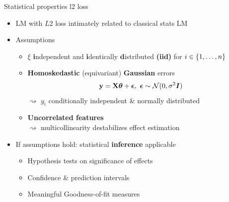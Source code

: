 \documentclass[11pt,compress,t,notes=noshow, xcolor=table]{beamer}
\begin{document}
\begin{vbframe}{Statistical properties l2 loss}

\begin{itemize}
    \item LM with $L2$ loss intimately related to classical stats LM
    \item Assumptions
    \begin{itemize}
        \item $\xi$ \textbf{i}ndependent and \textbf{i}dentically \textbf{d}istributed \textbf{(iid)} for $i \in \{1, \ldots, n\}$
        \item \textbf{Homoskedastic} (equivariant) 
         \textbf{Gaussian} errors
        $$\mathbf{y} = \mathbf{X} \bm{\theta} + \bm{\epsilon}, ~ \bm{\epsilon} \sim 
        \mathcal{N}(0, \sigma^2 \boldsymbol{I})  $$
        $\rightsquigarrow$ $y_i$ conditionally independent \& normally distributed
        \item \textbf{Uncorrelated features} \\$\rightsquigarrow$ 
        multicollinearity destabilizes effect estimation 
    \end{itemize}
    \item If assumptions hold: statistical \textbf{inference} applicable
    \begin{itemize}
            \item Hypothesis tests on significance of effects
            \item Confidence \& prediction intervals
            \item Meaningful Goodness-of-fit measures 
    \end{itemize}
\end{itemize}

\end{vbframe}




\end{document}
